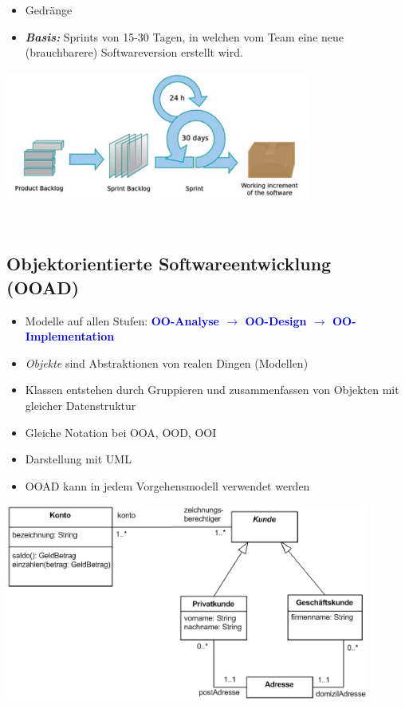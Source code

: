 \begin{multicols}{2}
\begin{minipage}[l]{10cm}
	\begin{itemize}
		\item Gedränge
		\item \textit{\textbf{Basis:}} Sprints von 15-30 Tagen, in welchen vom Team eine \newline neue (brauchbarere) Softwareversion erstellt wird. 
	\end{itemize}
\end{minipage}
\begin{minipage}{10cm}
	\includegraphics[width=10cm]{images/scrum.png}
\end{minipage}
\\
\end{multicols}

\subsection{Objektorientierte Softwareentwicklung (OOAD)}
\begin{minipage}[b]{13cm}
	\begin{itemize}
		\item Modelle auf allen Stufen:\textcolor{blue}{\textbf{ OO-Analyse $\rightarrow$ OO-Design $\rightarrow$ OO-Implementation}}
		\item \textit{Objekte} sind Abstraktionen von realen Dingen (Modellen)
		\item Klassen entstehen durch Gruppieren und zusammenfassen von Objekten mit gleicher Datenstruktur
		\item Gleiche Notation bei OOA, OOD, OOI
		\item Darstellung mit UML
		\item OOAD kann in jedem Vorgehensmodell verwendet werden
	\end{itemize}
	\vspace{1pt}
\end{minipage}
\newline
\includegraphics[width=12cm]{images/uml.png}

